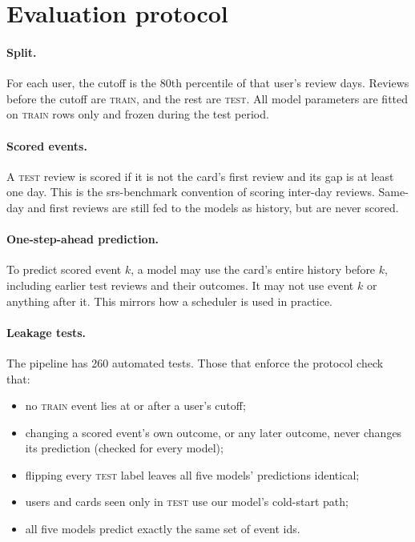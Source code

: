 \documentclass[11pt,a4paper]{article}
\begin{document}
\section{Evaluation protocol}
\paragraph{Split.} For each user, the cutoff is the 80th percentile of that user's review days. Reviews before the cutoff are \textsc{train}, and the rest are \textsc{test}. All model parameters are fitted on \textsc{train} rows only and frozen during the test period.

\paragraph{Scored events.} A \textsc{test} review is scored if it is not the card's first review and its gap is at least one day. This is the srs-benchmark convention of scoring inter-day reviews. Same-day and first reviews are still fed to the models as history, but are never scored.

\paragraph{One-step-ahead prediction.} To predict scored event $k$, a model may use the card's entire history before $k$, including earlier test reviews and their outcomes. It may not use event $k$ or anything after it. This mirrors how a scheduler is used in practice.

\paragraph{Leakage tests.} The pipeline has 260 automated tests. Those that enforce the protocol check that:
\begin{itemize}
  \item no \textsc{train} event lies at or after a user's cutoff;
  \item changing a scored event's own outcome, or any later outcome, never changes its prediction (checked for every model);
  \item flipping every \textsc{test} label leaves all five models' predictions identical;
  \item users and cards seen only in \textsc{test} use our model's cold-start path;
  \item all five models predict exactly the same set of event ids.
\end{itemize}
\end{document}
